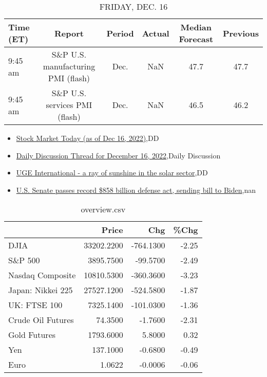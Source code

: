 \documentclass{article}%
\begin{document}
%


\begin{table}[htbp]%
\caption{FRIDAY, DEC. 16}%
\centering%
\begin{adjustbox}{width=1\textwidth}%
\begin{tabular}{lccccc}
\toprule
Time (ET) &                             Report & Period & Actual & Median Forecast & Previous \\
\midrule
  9:45 am & S\&P U.S. manufacturing PMI (flash) &   Dec. &    NaN &            47.7 &     47.7 \\
  9:45 am &      S\&P U.S. services PMI (flash) &   Dec. &    NaN &            46.5 &     46.2 \\
\bottomrule
\end{tabular}
%
\end{adjustbox}%
\end{table}

%
\begin{itemize}%
\item%
\href{https://reddit.com/r/wallstreetbets/comments/zndwc6/stock\_market\_today\_as\_of\_dec\_16\_2022/}{Stock Market Today (as of Dec 16, 2022)},DD%
\item%
\href{https://reddit.com/r/wallstreetbets/comments/znc0v9/daily\_discussion\_thread\_for\_december\_16\_2022/}{Daily Discussion Thread for December 16, 2022},Daily Discussion%
\item%
\href{https://reddit.com/r/Baystreetbets/comments/zn809c/uge\_international\_a\_ray\_of\_sunshine\_in\_the\_solar/}{UGE International - a ray of sunshine in the solar sector},DD%
\item%
\href{https://reddit.com/r/Economics/comments/zn6kq8/us\_senate\_passes\_record\_858\_billion\_defense\_act/}{U.S. Senate passes record \$858 billion defense act, sending bill to Biden},nan%
\end{itemize}%


\begin{table}[htbp]%
\caption{overview.csv}%
\centering%
\begin{adjustbox}{width=1\textwidth}%
\begin{tabular}{lrrr}
\toprule
                  &      Price &       Chg &  \%Chg \\
\midrule
             DJIA & 33202.2200 & -764.1300 & -2.25 \\
          S\&P 500 &  3895.7500 &  -99.5700 & -2.49 \\
 Nasdaq Composite & 10810.5300 & -360.3600 & -3.23 \\
Japan: Nikkei 225 & 27527.1200 & -524.5800 & -1.87 \\
     UK: FTSE 100 &  7325.1400 & -101.0300 & -1.36 \\
Crude Oil Futures &    74.3500 &   -1.7600 & -2.31 \\
     Gold Futures &  1793.6000 &    5.8000 &  0.32 \\
              Yen &   137.1000 &   -0.6800 & -0.49 \\
             Euro &     1.0622 &   -0.0006 & -0.06 \\
\bottomrule
\end{tabular}
%
\end{adjustbox}%
\end{table}
\end{document}
